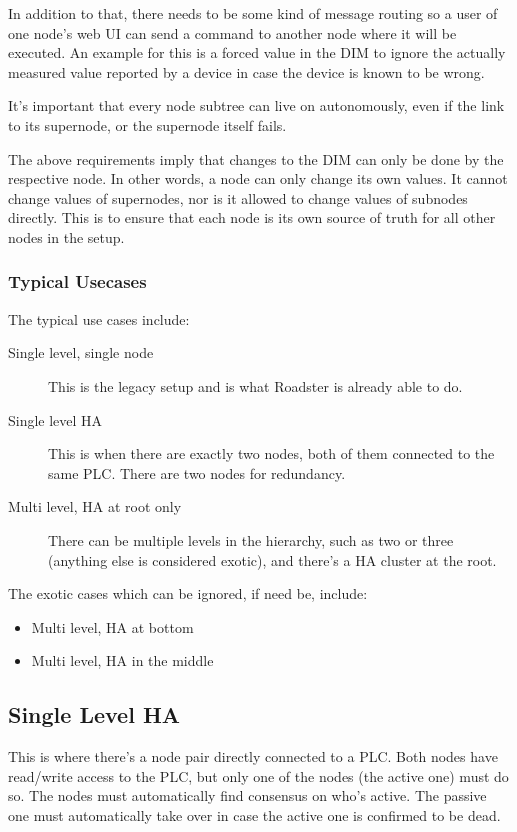In addition to that, there needs to be some kind of message routing so a user
of one node's web UI can send a command to another node where it will be
executed. An example for this is a forced value in the DIM to ignore the
actually measured value reported by a device in case the device is known to be
wrong.

It's important that every node subtree can live on autonomously, even if the
link to its supernode, or the supernode itself fails.

The above requirements imply that changes to the DIM can only be done by the
respective node. In other words, a node can only change its own values. It
cannot change values of supernodes, nor is it allowed to change values of
subnodes directly. This is to ensure that each node is its own source of truth
for all other nodes in the setup.


\subsubsection{Typical Usecases}
The typical use cases include:

\begin{description}
	\item [ Single level, single node ]
		This is the legacy setup and is what Roadster is already able to do.

	\item [ Single level \gls{HA} ]
		This is when there are exactly two nodes, both of them
		connected to the same PLC. There are two nodes for redundancy.

	\item [ Multi level, \gls{HA} at root only ]
		There can be multiple levels in the hierarchy, such as two or
		three (anything else is considered exotic), and there's a HA
		cluster at the root.
\end{description}

The exotic cases which can be ignored, if need be, include:

\begin{itemize}
	\item Multi level, HA at bottom
	\item Multi level, HA in the middle
\end{itemize}


\subsection{Single Level HA}
This is where there's a node pair directly connected to a PLC. Both nodes have
read\slash write access to the PLC, but only one of the nodes (the active one)
must do so. The nodes must automatically find consensus on who's active. The
passive one must automatically take over in case the active one is confirmed to
be dead.\\

